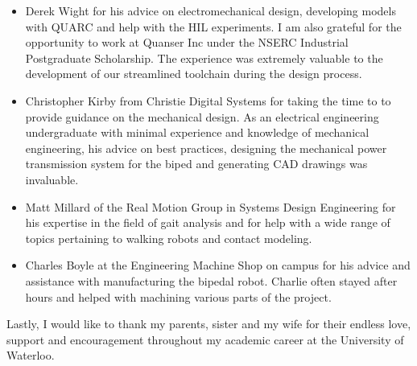 \begin{itemize}
    \item Derek Wight for his advice on electromechanical design, developing models with QUARC and help with the HIL experiments. I am also grateful for the opportunity to work at Quanser Inc under the NSERC Industrial Postgraduate Scholarship. The experience was extremely valuable to the development of our streamlined toolchain during the design process. \\

    \item Christopher Kirby from Christie Digital Systems for taking the time to to provide guidance on the mechanical design. As an electrical engineering undergraduate with minimal experience and knowledge of mechanical engineering, his advice on best  practices, designing the mechanical power transmission system for the biped and generating CAD drawings was invaluable. \\

    \item Matt Millard of the Real Motion Group in Systems Design Engineering for his expertise in the field of gait analysis and for help with a wide range of topics pertaining to walking robots and contact modeling.  \\

    \item Charles Boyle at the Engineering Machine Shop on campus for his advice and assistance with manufacturing the bipedal robot. Charlie often stayed after hours and helped with machining various parts of the project.  \\

\end{itemize}

Lastly, I would like to thank my parents, sister and my wife for their endless love, support and encouragement throughout my academic career at the University of Waterloo. 

\cleardoublepage





\renewcommand\contentsname{Table of Contents}
\tableofcontents
\cleardoublepage
{}


